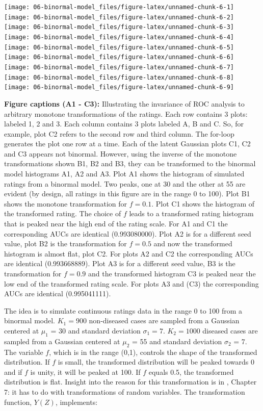 \documentclass[
]{book}
\begin{document}
\texttt{[image: 06-binormal-model\_files/figure-latex/unnamed-chunk-6-1]} \texttt{[image: 06-binormal-model\_files/figure-latex/unnamed-chunk-6-2]} \texttt{[image: 06-binormal-model\_files/figure-latex/unnamed-chunk-6-3]} \texttt{[image: 06-binormal-model\_files/figure-latex/unnamed-chunk-6-4]} \texttt{[image: 06-binormal-model\_files/figure-latex/unnamed-chunk-6-5]} \texttt{[image: 06-binormal-model\_files/figure-latex/unnamed-chunk-6-6]} \texttt{[image: 06-binormal-model\_files/figure-latex/unnamed-chunk-6-7]} \texttt{[image: 06-binormal-model\_files/figure-latex/unnamed-chunk-6-8]} \texttt{[image: 06-binormal-model\_files/figure-latex/unnamed-chunk-6-9]}

\textbf{Figure captions (A1 - C3):} Illustrating the invariance of ROC analysis to arbitrary monotone transformations of the ratings. Each row contains 3 plots: labeled 1, 2 and 3. Each column contains 3 plots labeled A, B and C. So, for example, plot C2 refers to the second row and third column. The for-loop generates the plot one row at a time. Each of the latent Gaussian plots C1, C2 and C3 appears not binormal. However, using the inverse of the monotone transformations shown B1, B2 and B3, they can be transformed to the binormal model histograms A1, A2 and A3. Plot A1 shows the histogram of simulated ratings from a binormal model. Two peaks, one at 30 and the other at 55 are evident (by design, all ratings in this figure are in the range 0 to 100). Plot B1 shows the monotone transformation for \(f = 0.1\). Plot C1 shows the histogram of the transformed rating. The choice of \(f\) leads to a transformed rating histogram that is peaked near the high end of the rating scale. For A1 and C1 the corresponding AUCs are identical (0.993080000). Plot A2 is for a different seed value, plot B2 is the transformation for \(f = 0.5\) and now the transformed histogram is almost flat, plot C2. For plots A2 and C2 the corresponding AUCs are identical (0.993668889). Plot A3 is for a different seed value, B3 is the transformation for \(f = 0.9\) and the transformed histogram C3 is peaked near the low end of the transformed rating scale. For plots A3 and (C3) the corresponding AUCs are identical (0.995041111).

The idea is to simulate continuous ratings data in the range 0 to 100 from a binormal model. \(K_1 = 900\) non-diseased cases are sampled from a Gaussian centered at \(\mu_1\) = 30 and standard deviation \(\sigma_1 = 7\). \(K_2 = 1000\) diseased cases are sampled from a Gaussian centered at \(\mu_2\) = 55 and standard deviation \(\sigma_2\) = 7. The variable \(f\), which is in the range (0,1), controls the shape of the transformed distribution. If \(f\) is small, the transformed distribution will be peaked towards 0 and if \(f\) is unity, it will be peaked at 100. If \(f\) equals 0.5, the transformed distribution is flat. Insight into the reason for this transformation is in \citep{RN300}, Chapter 7: it has to do with transformations of random variables. The transformation function, \(Y(Z)\), implements:
\end{document}
